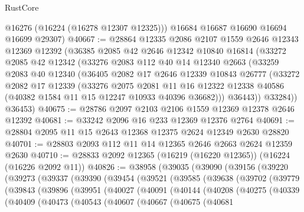 \begin{lexlean}{RustCore}
\begin{coremodule}
        @16276
        (@16224 (@16278 @12307 @12325)))
      @16684
      @16687
      @16690
      @16694
      @16699
      @29307)
@40667 := @28864
    @12335
    @2086
    @2107
    @1559
    @2646
    @12343
    @12369
    @12392
    (@36385
      @2085
      @42
      @2646
      @12342
      @10840
      @16814
      (@33272
        @2085
        @42
        @12342
        (@33276
          @2083
          @112
          @40
          @14
          @12340
          @2663
          (@33259
            @2083
            @40
            @12340
            (@36405
              @2082
              @17
              @2646
              @12339
              @10843
              @26777
              (@33272
                @2082
                @17
                @12339
                (@33276
                  @2075
                  @2081
                  @11
                  @16
                  @12322
                  @12338
                  @40586
                  (@40382 @1584 @11 @15 @12247 @10933 @40396 @36682)))
              @36443))
          @33284))
      @36453)
@40675 := @28786 @2097 @2103 @2106 @1559 @12369 @12378 @2646 @12392
@40681 := @33242 @2096 @16 @233 @12369 @12376 @2764
@40691 := @28804 @2095 @11 @15 @2643 @12368 @12375 @2624 @12349 @2630 @28820
@40701 := @28803 @2093 @112 @11 @14 @12365 @2646 @2663 @2624 @12359 @2630
@40710 := @28833 @2092 @12365 (@16219 (@16220 @12365)) (@16224 (@16226 @2092 @11))
@40826 := @38958
    (@39035
      (@39090
        (@39156
          (@39220
            (@39273
              (@39337
                (@39390
                  (@39454
                    (@39521
                      (@39585
                        (@39638
                          (@39702
                            (@39779
                              (@39843
                                (@39896
                                  (@39951
                                    (@40027
                                      (@40091
                                        (@40144
                                          (@40208
                                            (@40275
                                              (@40339
                                                (@40409
                                                  (@40473
                                                    (@40543
                                                      (@40607
                                                        (@40667
                                                          (@40675
                                                            (@40681

\end{coremodule}
\end{lexlean}
